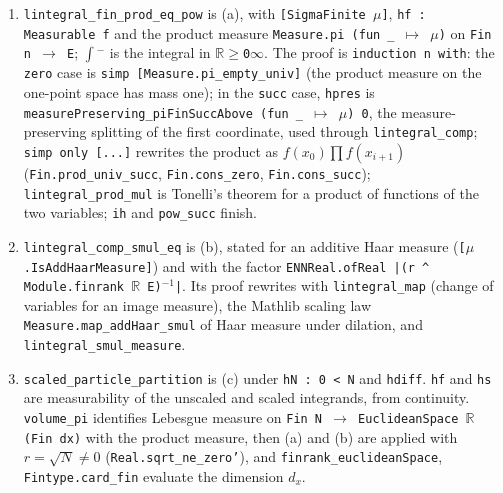 \documentclass[11pt,a4paper]{article}
\begin{document}
\begin{leanbox}
\begin{enumerate}
\item \texttt{lintegral\_\allowbreak{}fin\_\allowbreak{}prod\_\allowbreak{}eq\_\allowbreak{}pow} is (a), with \texttt{[Sigma\allowbreak{}Finite \ensuremath{\mu}]}, \texttt{hf : Measurable f} and the product measure \texttt{Measure.\allowbreak{}pi (fun \_\allowbreak{} \ensuremath{\mapsto} \ensuremath{\mu})} on \texttt{Fin n \ensuremath{\to} E}; \texttt{\ensuremath{\int}\ensuremath{{}^{-}}} is the integral in \texttt{\ensuremath{\mathbb R}\ensuremath{\ge}0\ensuremath{\infty}}. The proof is \texttt{induction n with}: the \texttt{zero} case is \texttt{simp [Measure.\allowbreak{}pi\_\allowbreak{}empty\_\allowbreak{}univ]} (the product measure on the one-point space has mass one); in the \texttt{succ} case, \texttt{hpres} is \texttt{measure\allowbreak{}Preserving\_\allowbreak{}pi\allowbreak{}Fin\allowbreak{}Succ\allowbreak{}Above (fun \_\allowbreak{} \ensuremath{\mapsto} \ensuremath{\mu}) 0}, the measure-preserving splitting of the first coordinate, used through \texttt{lintegral\_\allowbreak{}comp}; \texttt{simp only [.\allowbreak{}.\allowbreak{}.\allowbreak{}]} rewrites the product as \(f(x_0)\prod f(x_{i+1})\) (\texttt{Fin.\allowbreak{}prod\_\allowbreak{}univ\_\allowbreak{}succ}, \texttt{Fin.\allowbreak{}cons\_\allowbreak{}zero}, \texttt{Fin.\allowbreak{}cons\_\allowbreak{}succ}); \texttt{lintegral\_\allowbreak{}prod\_\allowbreak{}mul} is Tonelli's theorem for a product of functions of the two variables; \texttt{ih} and \texttt{pow\_\allowbreak{}succ} finish.

\item \texttt{lintegral\_\allowbreak{}comp\_\allowbreak{}smul\_\allowbreak{}eq} is (b), stated for an additive Haar measure (\texttt{[\ensuremath{\mu}.\allowbreak{}Is\allowbreak{}Add\allowbreak{}Haar\allowbreak{}Measure]}) and with the factor \texttt{ENNReal.\allowbreak{}of\allowbreak{}Real |(r \textasciicircum{} Module.\allowbreak{}finrank \ensuremath{\mathbb R} E)\ensuremath{{}^{-1}}|}. Its proof rewrites with \texttt{lintegral\_\allowbreak{}map} (change of variables for an image measure), the Mathlib scaling law \texttt{Measure.\allowbreak{}map\_\allowbreak{}add\allowbreak{}Haar\_\allowbreak{}smul} of Haar measure under dilation, and \texttt{lintegral\_\allowbreak{}smul\_\allowbreak{}measure}.

\item \texttt{scaled\_\allowbreak{}particle\_\allowbreak{}partition} is (c) under \texttt{h\allowbreak{}N : 0 < N} and \texttt{hdiff}. \texttt{hf} and \texttt{hs} are measurability of the unscaled and scaled integrands, from continuity. \texttt{volume\_\allowbreak{}pi} identifies Lebesgue measure on \texttt{Fin N \ensuremath{\to} Euclidean\allowbreak{}Space \ensuremath{\mathbb R} (Fin dx)} with the product measure, then (a) and (b) are applied with \(r=\sqrt N\ne0\) (\texttt{Real.\allowbreak{}sqrt\_\allowbreak{}ne\_\allowbreak{}zero'}), and \texttt{finrank\_\allowbreak{}euclidean\allowbreak{}Space}, \texttt{Fintype.\allowbreak{}card\_\allowbreak{}fin} evaluate the dimension \(d_x\).

\end{enumerate}
\end{leanbox}
\end{document}
